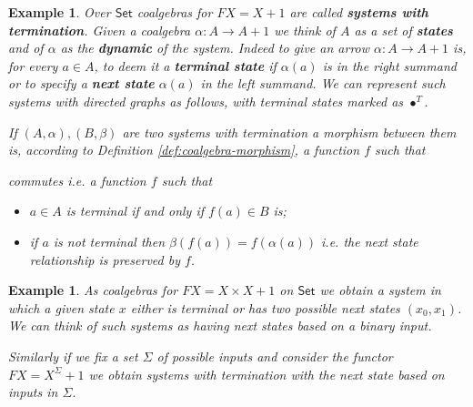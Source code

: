 \documentclass[letterpaper, 11pt, oneside]{memoir}
\theoremstyle{myteo}
\newtheorem{example}[theorem]{Example}
\numberwithin{equation}{section}
\newcommand{\marginnote}[1]{\marginpar{\footnotesize #1}}
\newcommand{\id}{\textsf{id}}
\newcommand{\Set}{\textsf{Set}}
\begin{document}
\begin{example}
  \label{ex:systems-with-termination}
  Over \(\Set\) coalgebras for \(FX = X + 1\) are called \textbf{systems with termination}\marginnote{systems with termination}.
  Given a coalgebra \(\alpha: A \to A + 1\) we think of \(A\) as a set of \textbf{states} and of \(\alpha\) as the \textbf{dynamic} of the system.
  Indeed to give an arrow \(\alpha:A \to A+1\) is, for every \(a \in A\), to deem it a \textbf{terminal state} if \(\alpha(a)\) is in the right summand or to specify a \textbf{next state} \(\alpha(a)\) in the left summand.
  We can represent such systems with directed graphs as follows, with terminal states marked as \(\bullet^T\).
  \begin{center}
  \end{center}
  If \((A, \alpha), (B, \beta)\) are two systems with termination a morphism between them is, according to Definition \ref{def:coalgebra-morphism}, a function \(f\) such that
  \begin{center}
  \end{center}
  commutes i.e. a function \(f\) such that
  \begin{itemize}
  \item[1.] \(a \in A\) is terminal if and only if \(f(a) \in B\) is;
  \item[2.] if \(a\) is not terminal then \(\beta(f(a)) = f(\alpha(a))\) i.e. the next state relationship is preserved by \(f\).
  \end{itemize}
\end{example}

\begin{example}
  As coalgebras for \(FX = X \times X + 1\) on \(\Set\) we obtain a system in which a given state \(x\) either is terminal or has two possible next states \((x_0, x_1)\).
  We can think of such systems as having next states based on a binary input.

  Similarly if we fix a set \(\Sigma\) of possible inputs and consider the functor \(FX = X^\Sigma + 1\) we obtain systems with termination with the next state based on inputs in \(\Sigma\).
\end{example}
\end{document}

